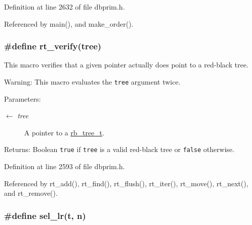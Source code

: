 Definition at line 2632 of file dbprim.h.

Referenced by main(), and make\_\-order().\hypertarget{group__dbprim__rbtree_ga18}{
\subsubsection[rt\_\-verify]{\setlength{\rightskip}{0pt plus 5cm}\#define rt\_\-verify(tree)}}
\label{group__dbprim__rbtree_ga18}


This macro verifies that a given pointer actually does point to a red-black tree.

\begin{Desc}
\item[Warning:]This macro evaluates the {\tt tree} argument twice.\end{Desc}
\begin{Desc}
\item[Parameters:]
\begin{description}
\item[\mbox{$\leftarrow$} {\em tree}]A pointer to a \hyperlink{group__dbprim__rbtree_ga0}{rb\_\-tree\_\-t}.\end{description}
\end{Desc}
\begin{Desc}
\item[Returns:]Boolean {\tt true} if {\tt tree} is a valid red-black tree or {\tt false} otherwise.\end{Desc}


Definition at line 2593 of file dbprim.h.

Referenced by rt\_\-add(), rt\_\-find(), rt\_\-flush(), rt\_\-iter(), rt\_\-move(), rt\_\-next(), and rt\_\-remove().\hypertarget{group__dbprim__rbtree_ga48}{
\subsubsection[sel\_\-lr]{\setlength{\rightskip}{0pt plus 5cm}\#define sel\_\-lr(t, n)}}
\label{group__dbprim__rbtree_ga48}


